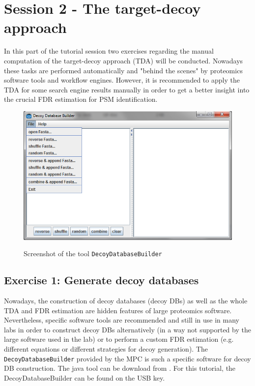 
\section{Session 2 - The target-decoy approach}
In this part of the tutorial session two exercises regarding the manual computation of the target-decoy approach (TDA) will be conducted. Nowadays these tasks are performed automatically and "behind the scenes" by proteomics software tools and workflow engines. However, it is recommended to apply the TDA for some search engine results manually in order to get a better insight into the crucial FDR estimation for PSM identification.
\begin{figure}[ht]
	\centering
		\includegraphics[scale=0.9]{graphics/targetdecoy/decoydatabasebuilder.png}
	\label{fig:decoydatabasebuilder}
	\caption{Screenshot of the tool \texttt{DecoyDatabaseBuilder}}
\end{figure}



\subsection{Exercise 1: Generate decoy databases}
Nowadays, the construction of decoy databases (decoy DBs) as well as the whole TDA and FDR estimation are hidden features of large proteomics software. Nevertheless, specific software tools are recommended and still in use in many labs in order to construct decoy DBs alternatively (in a way not supported by the large software used in the lab) or to perform a custom FDR estimation (e.g. different equations or different strategies for decoy generation). The \texttt{DecoyDatabaseBuilder} provided by the MPC is such a specific software for decoy DB construction. The java tool can be download from . For this tutorial, the DecoyDatabaseBuilder can be found on the USB key.

